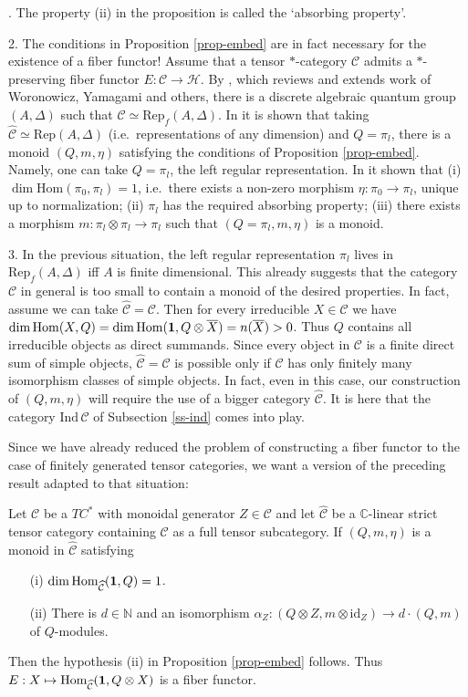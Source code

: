 \documentclass[12pt]{article}
\theoremstyle{definition}
\theoremstyle{definition}
\theoremstyle{remark}
\def\2#1{{\mathcal #1}}
\def\7#1{{\mathbb #1}}
\def\1#1{{\bf #1}}
\def\ol#1{{\overline #1}}
\newcommand{\Hom}{\mathrm{Hom}}
\newcommand{\Rep}{\mathrm{Rep}}
\newcommand{\rarr}{\rightarrow}
\def\id{\mathrm{id}}
\begin{document}
. The property (ii) in the proposition is called the `absorbing property'.

2. The conditions in Proposition \ref{prop-embed} are in fact necessary for the existence of a fiber
functor! Assume that a tensor $*$-category $\2C$ admits a $*$-preserving fiber functor
$E:\2C\rarr\2H$. By \cite{MRT}, which reviews and extends work of Woronowicz, Yamagami and others,
there is a discrete algebraic quantum group $(A,\Delta)$ such that $\2C\simeq\Rep_f(A,\Delta)$. In
\cite{MT} it is shown that taking 
$\widehat{\2C}\simeq\Rep(A,\Delta)$ (i.e.\ representations of any dimension) and $Q=\pi_l$, there is
a monoid $(Q,m,\eta)$ satisfying the conditions of Proposition \ref{prop-embed}. Namely, one can
take $Q=\pi_l$, the left regular representation. In \cite{MT} it shown that (i)
$\dim\Hom(\pi_0,\pi_l)=1$, i.e.\ there exists a non-zero morphism $\eta:\pi_0\rarr\pi_l$, unique  up
to normalization; (ii) $\pi_l$  has the required absorbing property; (iii) there exists a morphism
$m:\pi_l\otimes\pi_l\rarr\pi_l$ such  that $(Q=\pi_l,m,\eta)$ is a monoid.

3. In the previous situation, the left regular representation $\pi_l$ lives in $\Rep_f(A,\Delta)$
iff $A$ is finite dimensional. This already suggests that the category $\2C$ in general is too small
to contain a monoid of the desired properties. In fact, assume we can take $\widehat{\2C}=\2C$. Then
for every irreducible $X\in\2C$ we 
have $\dim\Hom(X,Q)=\dim\Hom(\11,Q\otimes\ol{X})=n(\ol{X})>0$. Thus $Q$ contains all irreducible
objects as direct summands. Since every object in $\2C$ is a finite direct sum of simple objects,
$\widehat{\2C}=\2C$ is possible only if $\2C$ has only finitely many isomorphism classes of simple
objects. In fact, even in this case, our construction of $(Q,m,\eta)$ will require the use of a
bigger category $\widehat{\2C}$. It is here that the category $\mathrm{Ind}\,\2C$ of Subsection
\ref{ss-ind} comes into play.
\erem

Since we have already reduced the problem of constructing a fiber functor to the case of finitely
generated tensor categories, we want a version of the preceding result adapted to that situation:

\bcoro \label{coro-monoid}
Let $\2C$ be a $TC^*$ with monoidal generator $Z\in\2C$ and let $\widehat{\2C}$ be a $\7C$-linear
strict tensor category containing $\2C$ as a full tensor subcategory. If $(Q,m,\eta)$ is a monoid in
$\widehat{\2C}$ satisfying
\begin{itemize}
\item[(i)] $\dim\Hom_{\widehat{\2C}}(\11,Q)=1$.
\item[(ii)] There is $d\in\7N$ and an isomorphism 
$\alpha_Z:(Q\otimes Z,m\otimes\id_Z)\rarr d\cdot(Q,m)$ of $Q$-modules.
\end{itemize}
Then the hypothesis (ii) in Proposition \ref{prop-embed} follows. Thus 
$E: X\mapsto\Hom_{\widehat{\2C}}(\11,Q\otimes X)$ is a fiber functor.
\ecoro
\end{document}
